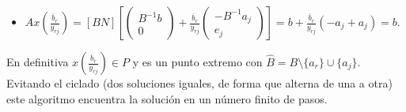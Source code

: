\documentclass[PM.tex]{subfiles}
\begin{document}
\begin{dem}
\begin{itemize}
\item $Ax(\frac{\overline{b}_r}{y_{rj}})=[B N]\left[\begin{pmatrix}
B^{-1}b\\
0
\end{pmatrix}+\frac{\overline{b}_r}{y_{rj}}\begin{pmatrix}
-B^{-1}a_j\\
e_j
\end{pmatrix}\right]=b+\frac{\overline{b}_r}{y_{rj}}(-a_j+a_j)=b$.
\end{itemize}
En definitiva $x(\frac{\overline{b}_r}{y_{rj}})\in P$ y es un punto extremo con $\hat{B}=B\setminus\{a_r\}\cup\{a_j\}$. Evitando el ciclado (dos soluciones iguales, de forma que alterna de una a otra) este algoritmo encuentra la solución en un número finito de pasos.
\end{dem}
\end{document}
